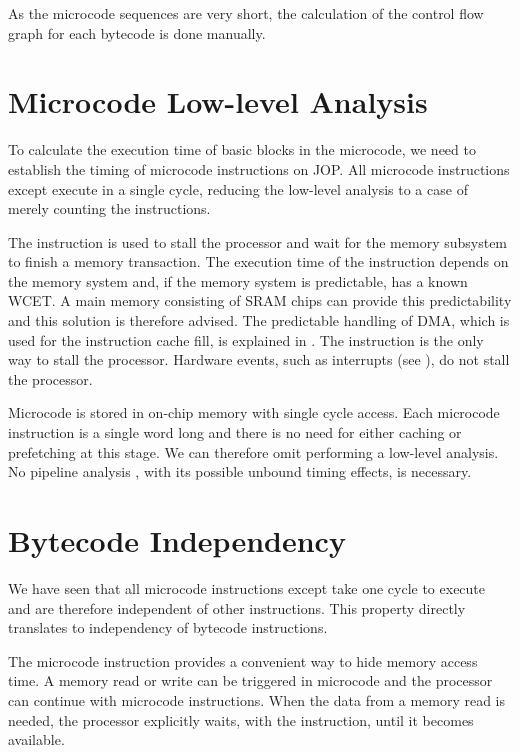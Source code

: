 As the microcode sequences are very short, the calculation of the
control flow graph for each bytecode is done manually.

\section{Microcode Low-level Analysis}

To calculate the execution time of basic blocks in the microcode, we
need to establish the timing of microcode instructions on JOP. All
microcode instructions except  execute in a single cycle,
reducing the low-level analysis to a case of merely counting the
instructions.

The  instruction is used to stall the processor and wait
for the memory subsystem to finish a memory transaction. The
execution time of the  instruction depends on the memory
system and, if the memory system is predictable, has a known WCET. A
main memory consisting of SRAM chips can provide this predictability
and this solution is therefore advised. The predictable handling of
DMA, which is used for the instruction cache fill, is explained in
\cite{jop:jtres_cache}. The  instruction is the only way
to stall the processor. Hardware events, such as interrupts (see
\cite{jop:design}), do not stall the processor.

Microcode is stored in on-chip memory with single cycle access. Each
microcode instruction is a single word long and there is no need for
either caching or prefetching at this stage. We can therefore omit
performing a low-level analysis. No pipeline analysis
\cite{EngblomPhD}, with its possible unbound timing effects, is
necessary.

\section{Bytecode Independency}

We have seen that all microcode instructions except  take
one cycle to execute and are therefore independent of other
instructions. This property directly translates to independency of
bytecode instructions.

The  microcode instruction provides a convenient way to
hide memory access time. A memory read or write can be triggered in
microcode and the processor can continue with microcode
instructions. When the data from a memory read is needed, the
processor explicitly waits, with the  instruction, until
it becomes available.

